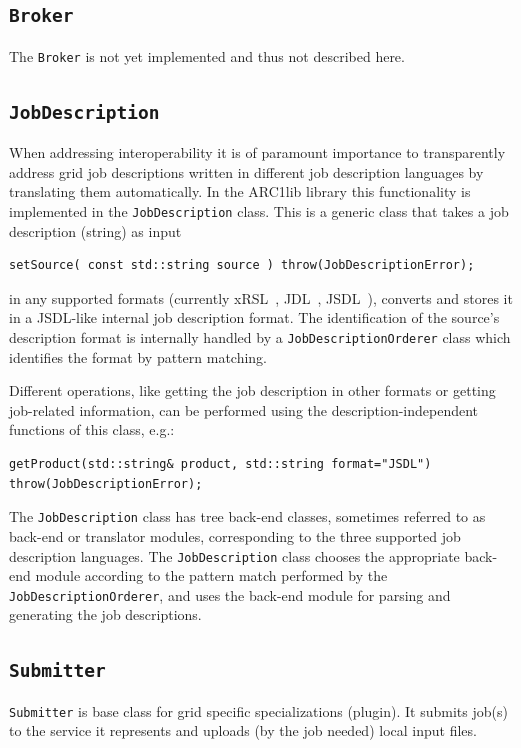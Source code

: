 \documentclass{book}
\newcommand{\Broker}{\texttt{Broker}}
\newcommand{\Submitter}{\texttt{Submitter}}
\newcommand{\JobDescription}{\texttt{JobDescription}}
\begin{document}
\subsection{{\Broker}} The {\Broker} is not yet implemented and thus not described here.

\subsection{{\JobDescription}} When addressing interoperability it is of paramount importance to transparently address grid job 
descriptions written in different job description languages by translating them automatically. In the ARC1lib library this functionality 
is implemented in the {\JobDescription} class. This is a generic class that takes a job description (string) as input 

\begin{shaded}
\begin{verbatim}
setSource( const std::string source ) throw(JobDescriptionError);
\end{verbatim}
\end{shaded}

in any supported formats (currently xRSL~\cite{xrsl}, JDL~\cite{jdl}, JSDL~\cite{jsdl}), converts and stores it in a JSDL-like internal job description format. The identification 
of the source's description format is internally handled by a \texttt{JobDescriptionOrderer} class which identifies the format by pattern
matching.

Different operations, like getting the job description in other formats or getting job-related information, can be performed using the 
description-independent functions of this class, e.g.:

\begin{shaded}
\begin{verbatim}
getProduct(std::string& product, std::string format="JSDL") throw(JobDescriptionError);
\end{verbatim}
\end{shaded}

The {\JobDescription} class has tree back-end classes, sometimes referred to as back-end or translator modules, corresponding to the three 
supported job description languages. The {\JobDescription} class chooses the appropriate back-end module according to the pattern match 
performed by the \texttt{JobDescriptionOrderer}, and uses the back-end module for parsing and generating the job descriptions.

\subsection{{\Submitter}} {\Submitter} is base class for grid specific specializations (plugin). It submits job(s) to the service 
it represents and uploads (by the job needed) local input files. 
\end{document}
